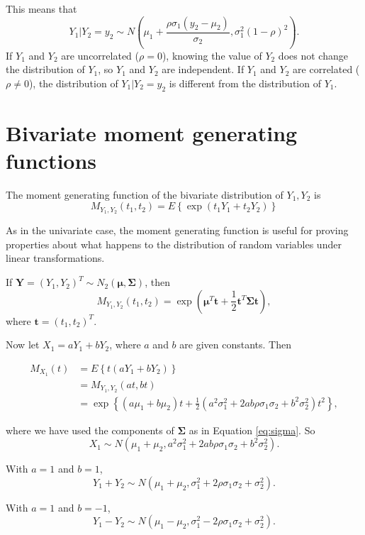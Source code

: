 \documentclass[]{book}
\theoremstyle{definition}
\theoremstyle{definition}
\theoremstyle{definition}
\theoremstyle{remark}
\let\BeginKnitrBlock\begin \let\EndKnitrBlock\end
\begin{document}
This means that
\[Y_1 | Y_2 = y_2 \sim N\left(\mu_1 + \frac{\rho \sigma_1(y_2 - \mu_2)}{\sigma_2},
  \sigma_1^2 (1 - \rho)^2\right).\] If \(Y_1\) and \(Y_2\) are
uncorrelated (\(\rho = 0\)), knowing the value of \(Y_2\) does not
change the distribution of \(Y_1\), so \(Y_1\) and \(Y_2\) are
independent. If \(Y_1\) and \(Y_2\) are correlated (\(\rho \not = 0\)),
the distribution of \(Y_1 | Y_2 = y_2\) is different from the
distribution of \(Y_1\).

\section{Bivariate moment generating
functions}\label{bivariate-moment-generating-functions}

\BeginKnitrBlock{definition}
\protect\hypertarget{def:unnamed-chunk-70}{}{\label{def:unnamed-chunk-70}
}The moment generating function of the bivariate distribution of
\(Y_1, Y_2\) is
\[M_{Y_1, Y_2}(t_1, t_2) = E\left\{\exp(t_1 Y_1 + t_2 Y_2) \right\}\]
\EndKnitrBlock{definition} As in the univariate case, the moment
generating function is useful for proving properties about what happens
to the distribution of random variables under linear transformations.

\BeginKnitrBlock{example}[Bivariate normal mgf]
\protect\hypertarget{exm:bvnmgf}{}{\label{exm:bvnmgf} \iffalse (Bivariate
normal mgf) \fi{} }If
\(\bm Y = (Y_1, Y_2)^T \sim N_2(\bm \mu, \bm \Sigma)\), then
\[M_{Y_1, Y_2}(t_1, t_2) = \exp(\bm \mu^T \bm t + \frac{1}{2} \bm t^T \bm \Sigma \bm t),\]
where \(\bm t = (t_1, t_2)^T\).

Now let \(X_1 = a Y_1 + b Y_2\), where \(a\) and \(b\) are given
constants. Then

\begin{align*}
M_{X_1}(t) &= E \left\{ t(a Y_1 + b Y_2) \right\} \\
&= M_{Y_1, Y_2}(at, bt) \\
&= \exp\left\{(a \mu_1 + b \mu_2) t + \frac{1}{2} (a^2 \sigma_1^2 + 2 a b \rho \sigma_1\sigma_2 + b^2 \sigma_2^2) t^2\right\},
\end{align*}

where we have used the components of \(\bm \Sigma\) as in Equation
\eqref{eq:sigma}. So
\[X_1 \sim N(\mu_1 + \mu_2, a^2 \sigma_1^2 + 2 a b \rho\sigma_1 \sigma_2 + b^2 \sigma_2^2).\]

With \(a = 1\) and \(b = 1\),
\[Y_1 + Y_2 \sim  N(\mu_1 + \mu_2, \sigma_1^2 + 2 \rho\sigma_1 \sigma_2 + \sigma_2^2).\]

With \(a = 1\) and \(b = -1\),
\[Y_1 - Y_2 \sim N(\mu_1 - \mu_2, \sigma_1^2 - 2 \rho \sigma_1 \sigma_2 + \sigma_2^2).\]
\EndKnitrBlock{example}
\end{document}
